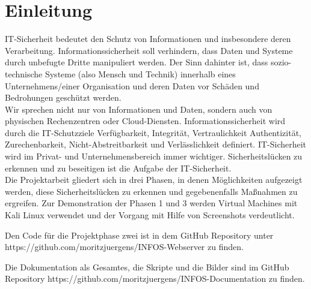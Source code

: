 \chapter*{Einleitung}

IT-Sicherheit bedeutet den Schutz von Informationen und insbesondere deren Verarbeitung. Informationssicherheit soll verhindern, dass Daten und Systeme durch unbefugte Dritte manipuliert werden. Der Sinn dahinter ist, dass sozio-technische Systeme (also Mensch und Technik) innerhalb eines Unternehmens/einer Organisation und deren Daten vor Schäden und Bedrohungen geschützt werden. \\
Wir sprechen nicht nur von Informationen und Daten, sondern auch von physischen Rechenzentren oder Cloud-Diensten. Informationssicherheit wird durch die IT-Schutzziele Verfügbarkeit, Integrität, Vertraulichkeit Authentizität, Zurechenbarkeit, Nicht-Abstreitbarkeit und Verlässlichkeit definiert. IT-Sicherheit wird im Privat- und Unternehmensbereich immer wichtiger. Sicherheitslücken zu erkennen und zu beseitigen ist die Aufgabe der IT-Sicherheit. \cite{hornetsecurity_2020} \\
Die Projektarbeit gliedert sich in drei Phasen, in denen Möglichkeiten aufgezeigt werden, diese Sicherheitslücken zu erkennen und gegebenenfalls Maßnahmen zu ergreifen. Zur Demonstration der Phasen 1 und 3 werden Virtual Machines mit Kali Linux verwendet und der Vorgang mit Hilfe von Screenshots verdeutlicht. 


Den Code für die Projektphase zwei ist in dem GitHub Repository unter\\ https://github.com/moritzjuergens/INFOS-Webserver zu finden.

Die Dokumentation als Gesamtes, die Skripte und die Bilder sind im GitHub Repository https://github.com/moritzjuergens/INFOS-Documentation zu finden. 